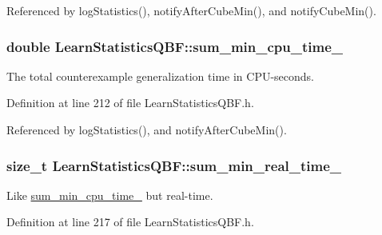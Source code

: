 Referenced by log\-Statistics(), notify\-After\-Cube\-Min(), and notify\-Cube\-Min().

\hypertarget{classLearnStatisticsQBF_a8fcce1bc5593631429c86bd3a1376e86}{
\subsubsection[{sum\-\_\-min\-\_\-cpu\-\_\-time\-\_\-}]{\setlength{\rightskip}{0pt plus 5cm}double Learn\-Statistics\-Q\-B\-F\-::sum\-\_\-min\-\_\-cpu\-\_\-time\-\_\-\hspace{0.3cm}{\ttfamily [protected]}}}\label{classLearnStatisticsQBF_a8fcce1bc5593631429c86bd3a1376e86}


The total counterexample generalization time in C\-P\-U-\/seconds. 



Definition at line 212 of file Learn\-Statistics\-Q\-B\-F.\-h.



Referenced by log\-Statistics(), and notify\-After\-Cube\-Min().

\hypertarget{classLearnStatisticsQBF_a6aded3992cd822a0ca45bc2d6658a5ab}{
\subsubsection[{sum\-\_\-min\-\_\-real\-\_\-time\-\_\-}]{\setlength{\rightskip}{0pt plus 5cm}size\-\_\-t Learn\-Statistics\-Q\-B\-F\-::sum\-\_\-min\-\_\-real\-\_\-time\-\_\-\hspace{0.3cm}{\ttfamily [protected]}}}\label{classLearnStatisticsQBF_a6aded3992cd822a0ca45bc2d6658a5ab}


Like \hyperlink{classLearnStatisticsQBF_a8fcce1bc5593631429c86bd3a1376e86}{sum\-\_\-min\-\_\-cpu\-\_\-time\-\_\-} but real-\/time. 



Definition at line 217 of file Learn\-Statistics\-Q\-B\-F.\-h.



